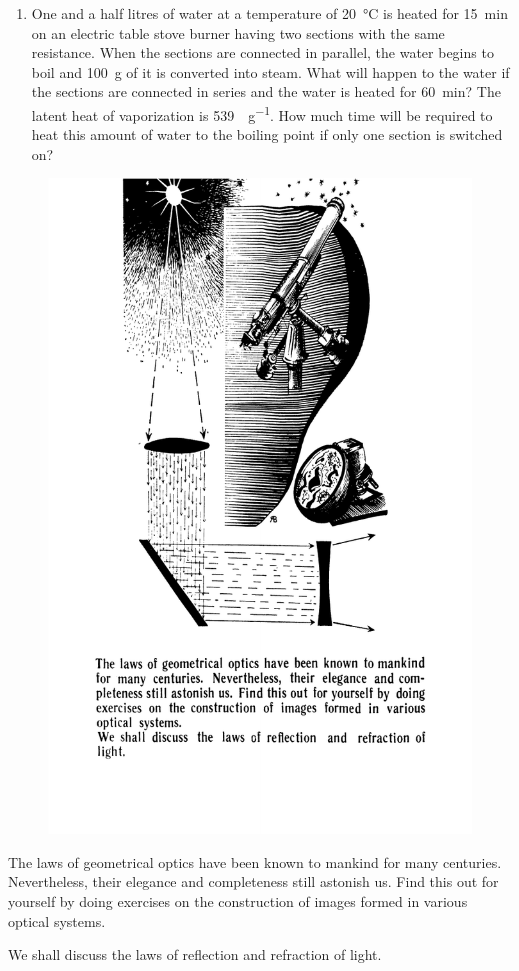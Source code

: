 \documentclass[a4paper,sfsidenotes]{tufte-book}
\begin{document}
\begin{enumerate}[resume=problems]
\item One and a half litres of water at a temperature of \SI{20}{\degreeCelsius} is heated for \SI{15}{\minute} on an electric table stove burner having two sections with the same resistance. When the sections are connected in parallel, the water begins to boil and \SI{100}{\gram} of it is converted into steam. What will happen to the water if the sections are connected in series and the water is heated for \SI{60}{\minute}? The latent heat of vaporization is \SI[per-mode=symbol]{539}{\calorie \per \gram}. How much time will be required to heat this amount of water to the boiling point if only one section is switched on?
\end{enumerate}


\cleardoublepage
\thispagestyle{empty}
\vspace*{2cm}

\begin{figure}
\centering
\includegraphics[width=0.65\linewidth]{sec-k.pdf}
\end{figure}
\begin{fullwidth}
\begin{Large}
The laws of geometrical optics have been known to mankind for many centuries. Nevertheless, their elegance and completeness still astonish us. Find this out for yourself by doing exercises on the construction of images  formed in various optical systems.

We shall discuss the laws of reflection and refraction of light.
\end{Large}
\end{fullwidth}
\end{document}
